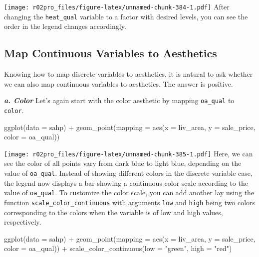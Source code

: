 \documentclass[
]{book}
\newenvironment{Shaded}{\begin{snugshade}}{\end{snugshade}}
\newcommand{\AttributeTok}[1]{\textcolor[rgb]{0.77,0.63,0.00}{#1}}
\newcommand{\FunctionTok}[1]{\textcolor[rgb]{0.00,0.00,0.00}{#1}}
\newcommand{\NormalTok}[1]{#1}
\newcommand{\SpecialCharTok}[1]{\textcolor[rgb]{0.00,0.00,0.00}{#1}}
\newcommand{\StringTok}[1]{\textcolor[rgb]{0.31,0.60,0.02}{#1}}
\begin{document}
\texttt{[image: r02pro\_files/figure-latex/unnamed-chunk-384-1.pdf]}
After changing the \texttt{heat\_qual} variable to a factor with desired levels, you can see the order in the legend changes accordingly.

\hypertarget{map-continous-aes}{%
\subsection{Map Continuous Variables to Aesthetics}\label{map-continous-aes}}

Knowing how to map discrete variables to aesthetics, it is natural to ask whether we can also map continuous variables to aesthetics. The answer is positive.

\textbf{\emph{a. Color}}
Let's again start with the color aesthetic by mapping \texttt{oa\_qual} to \texttt{color}.

\begin{Shaded}
\begin{Highlighting}[]
\FunctionTok{ggplot}\NormalTok{(}\AttributeTok{data =}\NormalTok{ sahp) }\SpecialCharTok{+} \FunctionTok{geom\_point}\NormalTok{(}\AttributeTok{mapping =} \FunctionTok{aes}\NormalTok{(}\AttributeTok{x =}\NormalTok{ liv\_area, }\AttributeTok{y =}\NormalTok{ sale\_price, }\AttributeTok{color =}\NormalTok{ oa\_qual))}
\end{Highlighting}
\end{Shaded}

\texttt{[image: r02pro\_files/figure-latex/unnamed-chunk-385-1.pdf]}
Here, we can see the color of all points vary from dark blue to light blue, depending on the value of \texttt{oa\_qual}. Instead of showing different colors in the discrete variable case, the legend now displays a bar showing a continuous color scale according to the value of \texttt{oa\_qual}. To customize the color scale, you can add another lay using the function \texttt{scale\_color\_continuous} with arguments \texttt{low} and \texttt{high} being two colors corresponding to the colors when the variable is of low and high values, respectively.

\begin{Shaded}
\begin{Highlighting}[]
\FunctionTok{ggplot}\NormalTok{(}\AttributeTok{data =}\NormalTok{ sahp) }\SpecialCharTok{+} \FunctionTok{geom\_point}\NormalTok{(}\AttributeTok{mapping =} \FunctionTok{aes}\NormalTok{(}\AttributeTok{x =}\NormalTok{ liv\_area, }\AttributeTok{y =}\NormalTok{ sale\_price, }\AttributeTok{color =}\NormalTok{ oa\_qual)) }\SpecialCharTok{+} \FunctionTok{scale\_color\_continuous}\NormalTok{(}\AttributeTok{low =} \StringTok{"green"}\NormalTok{, }\AttributeTok{high =} \StringTok{"red"}\NormalTok{)}
\end{Highlighting}
\end{Shaded}
\end{document}
